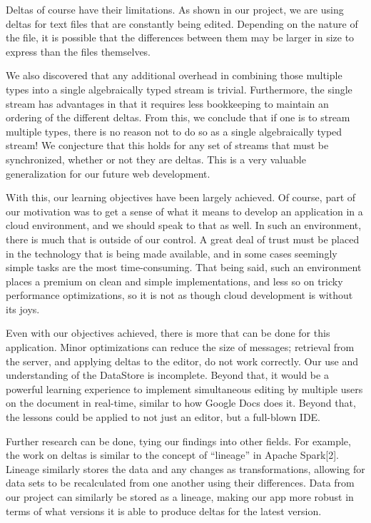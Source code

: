 \documentclass[12pt,a4paper]{article}
\begin{document}
		Deltas of course have their limitations. As shown in our project, we are using deltas for text files that are constantly being edited. Depending on the nature of the file, it is possible that the differences between them may be larger in size to express than the files themselves. 
		
		We also discovered that any additional overhead in combining those multiple types into a single algebraically typed stream is trivial. Furthermore, the single stream has advantages in that it requires less bookkeeping to maintain an ordering of the different deltas. From this, we conclude that if one is to stream multiple types, there is no reason not to do so as a single algebraically typed stream! We conjecture that this holds for any set of streams that must be synchronized, whether or not they are deltas. This is a very valuable generalization for our future web development.
		
		With this, our learning objectives have been largely achieved. Of course, part of our motivation was to get a sense of what it means to develop an application in a cloud environment, and we should speak to that as well. In such an environment, there is much that is outside of our control. A great deal of trust must be placed in the technology that is being made available, and in some cases seemingly simple tasks are the most time-consuming. That being said, such an environment places a premium on clean and simple implementations, and less so on tricky performance optimizations, so it is not as though cloud development is without its joys.
		
		Even with our objectives achieved, there is more that can be done for this application. Minor optimizations can reduce the size of messages; retrieval from the server, and applying deltas to the editor, do not work correctly. Our use and understanding of the DataStore is incomplete. Beyond that, it would be a powerful learning experience to implement simultaneous editing by multiple users on the document in real-time, similar to how Google Docs does it. Beyond that, the lessons could be applied to not just an editor, but a full-blown IDE.
		
		Further research can be done, tying our findings into other fields. For example, the work on deltas is similar to the concept of “lineage” in Apache Spark[2]. Lineage similarly stores the data and any changes as transformations, allowing for data sets to be recalculated from one another using their differences. Data from our project can similarly be stored as a lineage, making our app more robust in terms of what versions it is able to produce deltas for the latest version.
		
\end{document}
